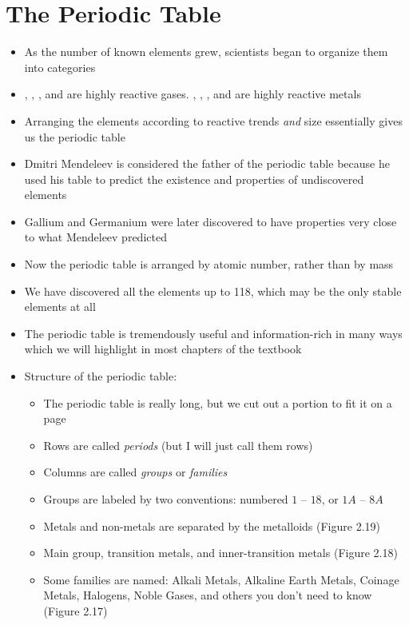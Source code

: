 \documentclass[12pt, openany, letterpaper]{memoir}
\begin{document}
\section{The Periodic Table}
\begin{itemize}
	\item As the number of known elements grew, scientists began to organize them into categories
	\item {}, , , and  are highly reactive gases. , , , and  are highly reactive metals
	\item Arranging the elements according to reactive trends \emph{and} size essentially gives us the periodic table
	\item Dmitri Mendeleev is considered the father of the periodic table because he used his table to predict the existence and properties of undiscovered elements
	\item Gallium and Germanium were later discovered to have properties very close to what Mendeleev predicted
	\item Now the periodic table is arranged by atomic number, rather than by mass
	\item We have discovered all the elements up to 118, which may be the only stable elements at all
	\item The periodic table is tremendously useful and information-rich in many ways which we will highlight in most chapters of the textbook
	\item Structure of the periodic table:
	      \begin{itemize}
		      \item The periodic table is really long, but we cut out a portion to fit it on a page
		      \item Rows are called \emph{periods} (but I will just call them rows)
		      \item Columns are called \emph{groups} or \emph{families}
		      \item Groups are labeled by two conventions: numbered $1$ -- $18$, or $1A$ -- $8A$
		      \item Metals and non-metals are separated by the metalloids (Figure 2.19)
		      \item Main group, transition metals, and inner-transition metals (Figure 2.18)
		      \item Some families are named: Alkali Metals, Alkaline Earth Metals, Coinage Metals, Halogens, Noble Gases, and others you don't need to know (Figure 2.17)
	      \end{itemize}
\end{itemize}
\end{document}

